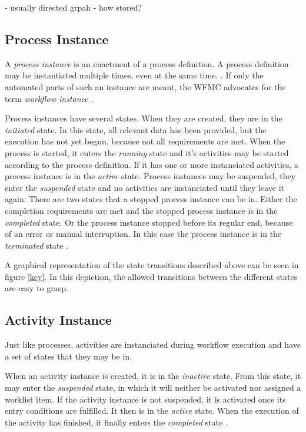       - usually directed grpah
      - how stored?

  \subsection{Process Instance} %
  \label{sub:process_instance}
    A \emph{process instance} is an enactment of a process definition. A process definition may be instantiated multiple times, even at the same time. \cite{Casati1999Specification}. If only the automated parts of such an instance are meant, the \ac{WFMC} advocates for the term \emph{workflow instance} \cite{Hollingsworth1995Wfmc}.

    Process instances have several states. When they are created, they are in the \emph{initiated} state. In this state, all relevant data has been provided, but the execution has not yet begun, \eg because not all requirements are met. When the process is started, it enters the \emph{running} state and it's activities may be started according to the process definition. If it has one or more instanciated activities, a process instance is in the \emph{active} state. Process instances may be suspended, \ie they enter the \emph{suspended} state and no activities are instanciated until they leave it again. There are two states that a stopped process instance can be in. Either the completion requirements are met and the stopped process instance is in the \emph{completed} state. Or the process instance stopped before its regular end, \ie because of an error or manual interruption. In this case the process instance is in the \emph{terminated} state \cite{Hollingsworth1995Wfmc}.

    A graphical representation of the state transitions described above can be seen in figure \ref{key}. In this depiction, the allowed transitions between the different states are easy to grasp.


  \subsection{Activity Instance} %
  \label{sub:activity_instance}
    Just like processes, activities are instanciated during workflow execution and have a set of states that they may be in.

    When an activity instance is created, it is in the \emph{inactive} state. From this state, it may enter the \emph{suspended} state, in which it will neither be activated nor assigned a worklist item. If the activity instance is not suspended, it is activated once its entry conditions are fulfilled. It then is in the \emph{active} state. When the execution of the activity has finished, it finally enters the \emph{completed} state \cite{Hollingsworth1995Wfmc}.


